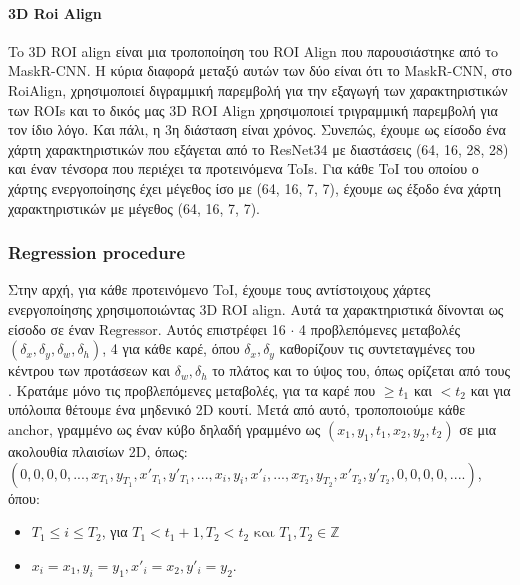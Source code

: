\paragraph{3D Roi Align}
\en To  \en 3D ROI align \gr είναι μια τροποποίηση του \en ROI Align \gr που παρουσιάστηκε από τo \en MaskR-CNN\gr. Η κύρια διαφορά μεταξύ αυτών των δύο είναι ότι το
\en MaskR-CNN\gr, στο \en RoiAlign\gr,  χρησιμοποιεί διγραμμική παρεμβολή για την εξαγωγή των χαρακτηριστικών των \en ROIs \gr και το δικός μας \en 3D ROI Align \gr χρησιμοποιεί
τριγραμμική παρεμβολή για τον ίδιο λόγο. Και πάλι, η 3η διάσταση είναι χρόνος.
Συνεπώς, έχουμε ως είσοδο ένα χάρτη χαρακτηριστικών που εξάγεται από το \en  ResNet34  \gr με διαστάσεις (64, 16, 28, 28) και έναν τένσορα που περιέχει τα προτεινόμενα \en ToIs\gr.
Για κάθε \en ToI \gr του οποίου ο χάρτης ενεργοποίησης έχει μέγεθος ίσο με (64, 16, 7, 7), έχουμε ως έξοδο ένα χάρτη χαρακτηριστικών με μέγεθος (64, 16, 7, 7).  \par

\subsubsection{\en Regression procedure}
\gr Στην αρχή, για κάθε προτεινόμενο \en ToI\gr, έχουμε τους αντίστοιχους χάρτες ενεργοποίησης χρησιμοποιώντας \en 3D ROI align\gr. Αυτά τα χαρακτηριστικά δίνονται ως είσοδο σε έναν \en Regressor\gr.
Αυτός επιστρέφει 16 $\cdot$ 4 προβλεπόμενες μεταβολές $(\delta_x,\delta_y, \delta_w,\delta_h)$, 4 για κάθε καρέ, όπου $ \delta_x, \delta_y$ καθορίζουν τις συντεταγμένες του κέντρου των προτάσεων και
$\delta_w, \delta_h$ το πλάτος και το ύψος του, όπως ορίζεται από τους \en\cite{DBLP:journals/corr/GirshickDDM13}\gr.
Κρατάμε μόνο τις προβλεπόμενες μεταβολές, για τα καρέ που $\ge t_1$ και $< t_2$ και για υπόλοιπα θέτουμε ένα μηδενικό \en 2D \gr κουτί. 
Μετά από αυτό, τροποποιούμε κάθε \en anchor\gr, γραμμένο ως έναν κύβο δηλαδή γραμμένο ως $(x_1,y_1,t_1, x_2, y_2, t_2)$ σε μια ακολουθία πλαισίων \en 2D\gr, όπως: \\
$(0,0,0,0, ..., x_{T_1},y_{T_1},x'_{T_1},y'_{T_1}, ... ,x_{i},y_{i},x'_{i}, ..., x_{T_2},y_{T_2},x'_{T_2},y'_{T_2}, 0,0,0,0, ....)$, \\
όπου:
\begin{itemize}
\item $ T_1 \le i \le T_2$, για $T_1 < t_1 + 1,  T_2 < t_2 \text{ και }T_1,T_2 \in \mathbb{Z} $
\item $ x_i = x_1, y_i= y_1, x'_i = x_2, y'_i = y_2 $.
\end{itemize}


